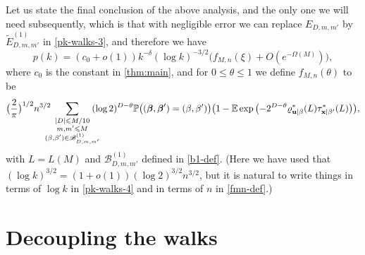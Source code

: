 \documentclass[11pt,reqno]{amsart}
\numberwithin{equation}{section}
\theoremstyle{definition}
\theoremstyle{remark}
\newcommand{\mb}{\mathbb}
\newcommand{\mbf}{\mathbf}
\def\boldbeta{\boldsymbol\beta}
\renewcommand{\le}{\leqslant}
\begin{document}
Let us state the final conclusion of the above analysis, and the only one we will need subsequently, which is that with negligible error we can replace $E_{D,m,m'}$ by $\tilde E^{(1)}_{D,m,m'}$ in \cref{pk-walks-3}, and therefore we have
\begin{equation}\label{pk-walks-4}  p(k) =  (c_0 + o(1))  k^{-\delta} (\log k)^{-3/2}  \big( f_{M,n}(\xi) +  O ( e^{-\Omega(M)}) \big),
\end{equation}
where $c_0$ is the constant in \cref{thm:main}, and for $0 \le \theta \le 1$ we define $f_{M,n}(\theta)$ to be
\begin{equation}\label{fmn-def} 
\big(\frac{2}{\pi}\big)^{1/2} n^{3/2}\!\!\!\!\!\sum_{\substack{|D| \le M/10  \\ m,m' \le M \\ (\beta,\beta') \in \mathscr{B}^{(1)}_{D,m,m'}} }\hspace{-0.3cm}(\log 2)^{D - \theta}  \mb{P} \big( (\boldbeta,\boldbeta') = (\beta,\beta') \big) \big( 1 - \mb{E} \exp\big({-}2^{D - \theta}  \varrho^*_{\mbf{u} \mid \beta}(L) \tau^*_{\mbf{x} \mid \beta'}(L)\big)\big) ,\end{equation}
with $L = L(M)$ and $\mathscr{B}^{(1)}_{D,m,m'}$ defined in \cref{b1-def}. (Here we have used that $(\log k)^{3/2} = (1 + o(1)) (\log 2)^{3/2} n^{3/2}$, but it is natural to write things in terms of $\log k$ in \cref{pk-walks-4} and in terms of $n$ in \cref{fmn-def}.)

\section{Decoupling the walks}\label{decouple-sec}
\end{document}

